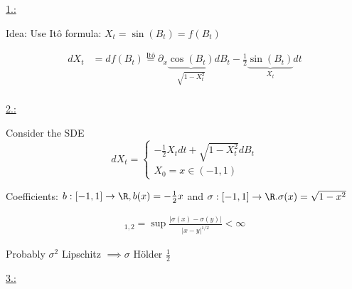 \underline{1.:}

Idea: Use Itô formula: $X_t=\sin(B_t)=f(B_t)$

\begin{align*}
    dX_t &= df(B_t)\stackrel{\text{Itô}}{=}\partial_x \underbrace{\cos(B_t)}_{\sqrt{1-X_t^2}}dB_t-\frac{1}{2}\underbrace{\sin(B_t)}_{X_t}dt\\
\end{align*}


\underline{2.:}


Consider the SDE
\[dX_t=\begin{cases}
    -\frac{1}{2} X_t dt + \sqrt{1-X_t^2}dB_t\\
    X_0=x\in(-1,1)
\end{cases}\]

Coefficients: $b:[-1,1]\to\R, b(x)=-\frac{1}{2}x$ and $\sigma:[-1,1]\to\R.\sigma(x)=\sqrt{1-x^2}$

\begin{align*}
    [\sigma]_{1,2}=\sup\frac{|\sigma(x)-\sigma(y)|}{|x-y|^{1/2}}<\infty
\end{align*}

Probably $\sigma^2$ Lipschitz $\implies\sigma$ Hölder $\frac{1}{2}$

\underline{3.:}

